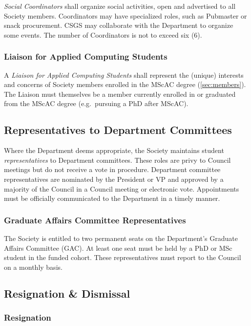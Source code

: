 \textit{Social Coordinators} shall organize social activities, open and advertised to all Society members. Coordinators may have specialized roles, such as Pubmaster or snack procurement. CSGS may collaborate with the Department to organize some events. The number of Coordinators is not to exceed six ($6$).

\subsubsection{Liaison for Applied Computing Students}

A \textit{Liaison for Applied Computing Students} shall represent the (unique)
interests and concerns of Society members enrolled in the MScAC degree
(\ref{sec:members}). The Liaison must themselves be a member currently enrolled
in or graduated from the MScAC degree (e.g.\ pursuing a PhD after MScAC).

\subsection{Representatives to Department Committees}\label{sec:representatives}

Where the Department deems appropriate, the Society maintains student
\textit{representatives} to Department committees. These roles are privy to
Council meetings but do not receive a vote in procedure. Department committee
representatives are nominated by the President or VP and approved by a majority
of the Council in a Council meeting or electronic vote. Appointments must be
officially communicated to the Department in a timely manner.

\subsubsection{Graduate Affairs Committee Representatives}

The Society is entitled to two permanent seats on the Department's Graduate
Affairs Committee (GAC). At least one seat must be held by a PhD or MSc student
in the funded cohort. These representatives must report to the Council on a
monthly basis.

\subsection{Resignation \& Dismissal}

\subsubsection{Resignation}

